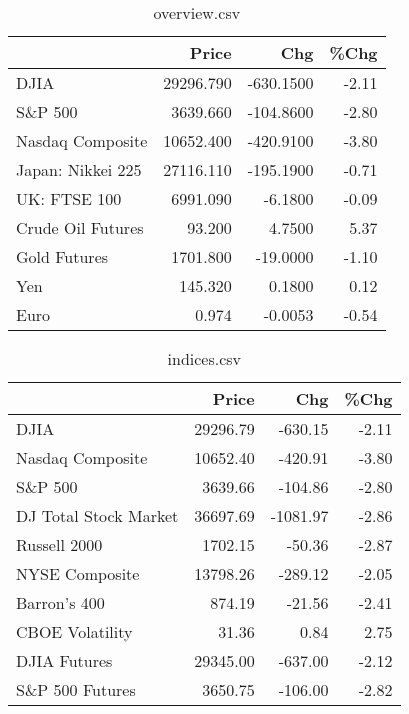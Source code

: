 \documentclass{article}%
\begin{document}
\begin{table}[htbp]%
\caption{overview.csv}%
\centering%
\begin{adjustbox}{width=1\textwidth}%
\begin{tabular}{lrrr}
\toprule
                  &     Price &       Chg &  \%Chg \\
\midrule
             DJIA & 29296.790 & -630.1500 & -2.11 \\
          S\&P 500 &  3639.660 & -104.8600 & -2.80 \\
 Nasdaq Composite & 10652.400 & -420.9100 & -3.80 \\
Japan: Nikkei 225 & 27116.110 & -195.1900 & -0.71 \\
     UK: FTSE 100 &  6991.090 &   -6.1800 & -0.09 \\
Crude Oil Futures &    93.200 &    4.7500 &  5.37 \\
     Gold Futures &  1701.800 &  -19.0000 & -1.10 \\
              Yen &   145.320 &    0.1800 &  0.12 \\
             Euro &     0.974 &   -0.0053 & -0.54 \\
\bottomrule
\end{tabular}
%
\end{adjustbox}%
\end{table}

%


\begin{table}[htbp]%
\caption{indices.csv}%
\centering%
\begin{adjustbox}{width=1\textwidth}%
\begin{tabular}{lrrr}
\toprule
                      &    Price &      Chg &  \%Chg \\
\midrule
                 DJIA & 29296.79 &  -630.15 & -2.11 \\
     Nasdaq Composite & 10652.40 &  -420.91 & -3.80 \\
              S\&P 500 &  3639.66 &  -104.86 & -2.80 \\
DJ Total Stock Market & 36697.69 & -1081.97 & -2.86 \\
         Russell 2000 &  1702.15 &   -50.36 & -2.87 \\
       NYSE Composite & 13798.26 &  -289.12 & -2.05 \\
         Barron's 400 &   874.19 &   -21.56 & -2.41 \\
      CBOE Volatility &    31.36 &     0.84 &  2.75 \\
         DJIA Futures & 29345.00 &  -637.00 & -2.12 \\
      S\&P 500 Futures &  3650.75 &  -106.00 & -2.82 \\
\bottomrule
\end{tabular}
%
\end{adjustbox}%
\end{table}
\end{document}
